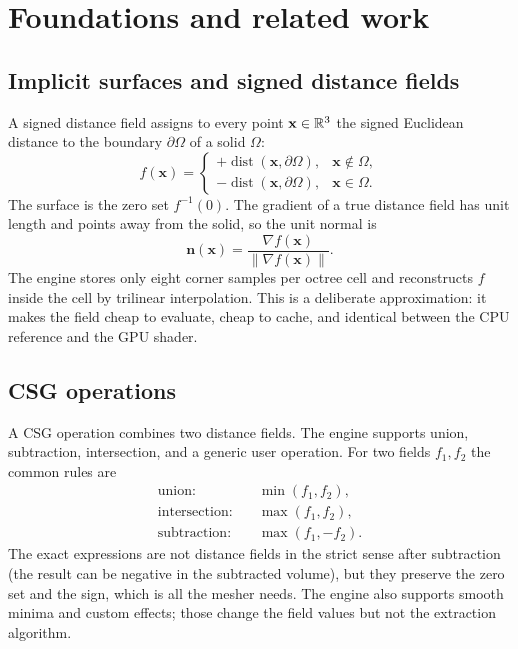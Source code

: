 \section{Foundations and related work}
\label{sec:foundations}

\subsection{Implicit surfaces and signed distance fields}

A signed distance field assigns to every point $\mathbf{x}\in\mathbb{R}^3$ the
signed Euclidean distance to the boundary $\partial\Omega$ of a solid
$\Omega$:
\begin{equation}
  f(\mathbf{x}) =
  \begin{cases}
    +\operatorname{dist}(\mathbf{x},\partial\Omega), & \mathbf{x}\notin\Omega,\\[2pt]
    -\operatorname{dist}(\mathbf{x},\partial\Omega), & \mathbf{x}\in\Omega.
  \end{cases}
  \label{eq:sdf}
\end{equation}
The surface is the zero set $f^{-1}(0)$.  The gradient of a true distance
field has unit length and points away from the solid, so the unit normal is
\begin{equation}
  \mathbf{n}(\mathbf{x}) = \frac{\nabla f(\mathbf{x})}{\|\nabla f(\mathbf{x})\|}.
  \label{eq:normal}
\end{equation}
The engine stores only eight corner samples per octree cell and
reconstructs $f$ inside the cell by trilinear interpolation.  This is a
deliberate approximation: it makes the field cheap to evaluate, cheap to
cache, and identical between the CPU reference and the GPU shader.

\subsection{CSG operations}

A CSG operation combines two distance fields.  The engine supports union,
subtraction, intersection, and a generic user operation.  For two fields
$f_1,f_2$ the common rules are
\begin{align}
  \text{union}:&\quad \min(f_1,f_2), \label{eq:union}\\
  \text{intersection}:&\quad \max(f_1,f_2), \label{eq:intersection}\\
  \text{subtraction}:&\quad \max(f_1,-f_2). \label{eq:subtraction}
\end{align}
The exact expressions are not distance fields in the strict sense after
subtraction (the result can be negative in the subtracted volume), but they
preserve the zero set and the sign, which is all the mesher needs.  The
engine also supports smooth minima and custom effects; those change the
field values but not the extraction algorithm.

